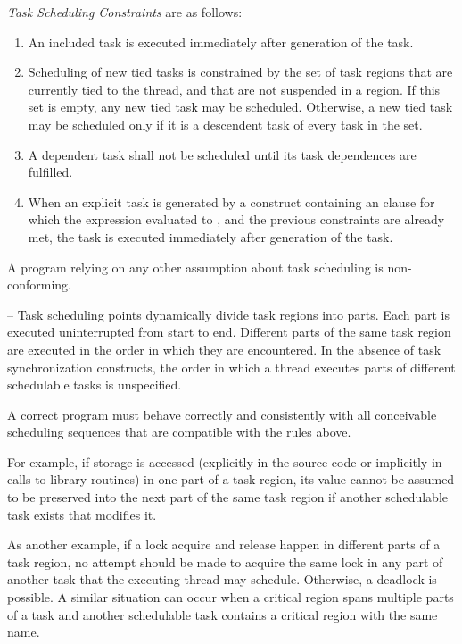\emph{Task Scheduling Constraints} are as follows:

\begin{enumerate}
\item An included task is executed immediately after generation of the task.

\item Scheduling of new tied tasks is constrained by the set of task regions that are currently 
tied to the thread, and that are not suspended in a  region. If this set is empty, 
any new tied task may be scheduled. Otherwise, a new tied task may be scheduled only 
if it is a descendent task of every task in the set.

\item A dependent task shall not be scheduled until its task dependences are fulfilled.

\item When an explicit task is generated by a construct containing an  clause for which the 
expression evaluated to , and the previous constraints are already met, the task is 
executed immediately after generation of the task.
\end{enumerate}

A program relying on any other assumption about task scheduling is non-conforming.

\notestart
\noteheader – Task scheduling points dynamically divide task regions into parts. Each part is 
executed uninterrupted from start to end. Different parts of the same task region are 
executed in the order in which they are encountered. In the absence of task 
synchronization constructs, the order in which a thread executes parts of different 
schedulable tasks is unspecified.

A correct program must behave correctly and consistently with all conceivable 
scheduling sequences that are compatible with the rules above.

For example, if  storage is accessed (explicitly in the source code or 
implicitly in calls to library routines) in one part of a task region, its value cannot be 
assumed to be preserved into the next part of the same task region if another schedulable 
task exists that modifies it.

As another example, if a lock acquire and release happen in different parts of a task 
region, no attempt should be made to acquire the same lock in any part of another task 
that the executing thread may schedule. Otherwise, a deadlock is possible. A similar 
situation can occur when a critical region spans multiple parts of a task and another 
schedulable task contains a critical region with the same name.

